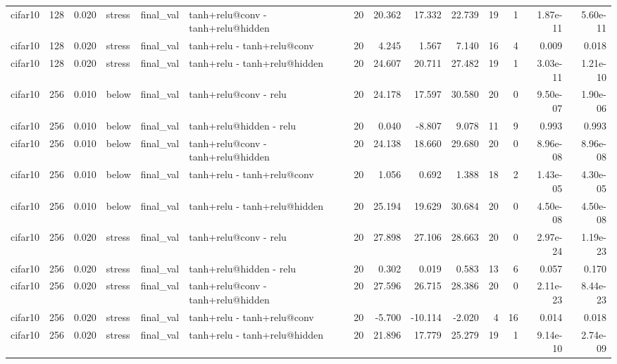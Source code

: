 \begin{table}[htbp]
{\begin{tabular}{@{}lrrlllrrrrrrrr@{}}
cifar10 & 128 & 0.020 & stress & final\_val & tanh+relu@conv - tanh+relu@hidden & 20 & 20.362 & 17.332 & 22.739 & 19 & 1 & 1.87e-11 & 5.60e-11 \\
cifar10 & 128 & 0.020 & stress & final\_val & tanh+relu - tanh+relu@conv & 20 & 4.245 & 1.567 & 7.140 & 16 & 4 & 0.009 & 0.018 \\
cifar10 & 128 & 0.020 & stress & final\_val & tanh+relu - tanh+relu@hidden & 20 & 24.607 & 20.711 & 27.482 & 19 & 1 & 3.03e-11 & 1.21e-10 \\
cifar10 & 256 & 0.010 & below & final\_val & tanh+relu@conv - relu & 20 & 24.178 & 17.597 & 30.580 & 20 & 0 & 9.50e-07 & 1.90e-06 \\
cifar10 & 256 & 0.010 & below & final\_val & tanh+relu@hidden - relu & 20 & 0.040 & -8.807 & 9.078 & 11 & 9 & 0.993 & 0.993 \\
cifar10 & 256 & 0.010 & below & final\_val & tanh+relu@conv - tanh+relu@hidden & 20 & 24.138 & 18.660 & 29.680 & 20 & 0 & 8.96e-08 & 8.96e-08 \\
cifar10 & 256 & 0.010 & below & final\_val & tanh+relu - tanh+relu@conv & 20 & 1.056 & 0.692 & 1.388 & 18 & 2 & 1.43e-05 & 4.30e-05 \\
cifar10 & 256 & 0.010 & below & final\_val & tanh+relu - tanh+relu@hidden & 20 & 25.194 & 19.629 & 30.684 & 20 & 0 & 4.50e-08 & 4.50e-08 \\
cifar10 & 256 & 0.020 & stress & final\_val & tanh+relu@conv - relu & 20 & 27.898 & 27.106 & 28.663 & 20 & 0 & 2.97e-24 & 1.19e-23 \\
cifar10 & 256 & 0.020 & stress & final\_val & tanh+relu@hidden - relu & 20 & 0.302 & 0.019 & 0.583 & 13 & 6 & 0.057 & 0.170 \\
cifar10 & 256 & 0.020 & stress & final\_val & tanh+relu@conv - tanh+relu@hidden & 20 & 27.596 & 26.715 & 28.386 & 20 & 0 & 2.11e-23 & 8.44e-23 \\
cifar10 & 256 & 0.020 & stress & final\_val & tanh+relu - tanh+relu@conv & 20 & -5.700 & -10.114 & -2.020 & 4 & 16 & 0.014 & 0.018 \\
cifar10 & 256 & 0.020 & stress & final\_val & tanh+relu - tanh+relu@hidden & 20 & 21.896 & 17.779 & 25.279 & 19 & 1 & 9.14e-10 & 2.74e-09 \\
\bottomrule
\end{tabular}}
\end{table}
